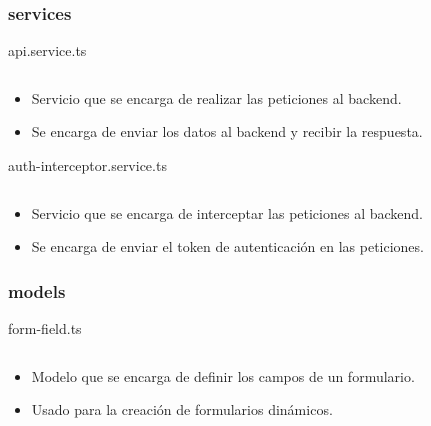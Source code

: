 \documentclass{article}
\newenvironment{block}{\captionsetup{type=listing}}{}
\begin{document}
\subsubsection{services}
\begin{block}
	\caption{api.service.ts}
	\inputminted{TypeScript}{kioskios_web/src/app/services/api.service.ts}
	\begin{itemize}
		\item Servicio que se encarga de realizar las peticiones al backend.
		\item Se encarga de enviar los datos al backend y recibir la respuesta.
	\end{itemize}

	\caption{auth-interceptor.service.ts}
	\inputminted[breaklines]{TypeScript}{kioskios_web/src/app/services/auth-interceptor.service.ts}
	\begin{itemize}
		\item Servicio que se encarga de interceptar las peticiones al backend.
		\item Se encarga de enviar el token de autenticación en las peticiones.
	\end{itemize}
\end{block}

\subsubsection{models}
\begin{block}
	\caption{form-field.ts}
	\inputminted{TypeScript}{kioskios_web/src/app/models/form-field.ts}
	\begin{itemize}
		\item Modelo que se encarga de definir los campos de un formulario.
		\item Usado para la creación de formularios dinámicos.
	\end{itemize}
\end{block}
\pagebreak
\end{document}
